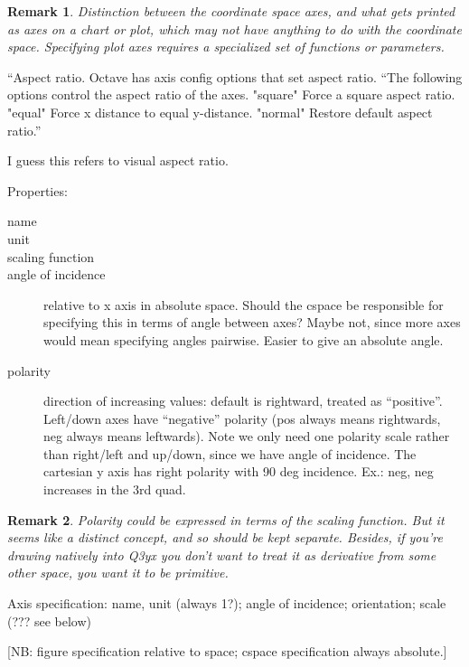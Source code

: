 \documentclass{tufte-handout}
\numberwithin{equation}{subsection}
\newtheorem{remark}{Remark}
\begin{document}
\begin{remark}
  Distinction between the coordinate space axes, and what gets printed
  as axes on a chart or plot, which may not have anything to do with
  the coordinate space.  Specifying plot axes requires a specialized
  set of functions or parameters.
\end{remark}

``Aspect ratio.  Octave has axis config options that set aspect ratio.
``The following options control the aspect ratio of the axes.
"square" Force a square aspect ratio.
"equal" Force x distance to equal y-distance.
"normal" Restore default aspect ratio.''

I guess this refers to visual aspect ratio.

Properties:

\begin{description}
\item [name]
\item [unit]
\item [scaling function]
\item [angle of incidence] relative to x axis in absolute space.
  Should the cspace be responsible for specifying this in terms of
  angle between axes?  Maybe not, since more axes would mean
  specifying angles pairwise.  Easier to give an absolute angle.
\item [polarity] direction of increasing values: default is rightward,
  treated as ``positive''.  Left/down axes have ``negative'' polarity
  (pos always means rightwards, neg always means leftwards).  Note we
  only need one polarity scale rather than right/left and up/down,
  since we have angle of incidence.  The cartesian y axis has right
  polarity with 90 deg incidence.  Ex.: neg, neg increases in the 3rd
  quad.
\end{description}

\begin{remark}
  Polarity could be expressed in terms of the scaling function.  But
  it seems like a distinct concept, and so should be kept separate.
  Besides, if you're drawing natively into Q3yx you don't want to
  treat it as derivative from some other space, you want it to be
  primitive.
\end{remark}

Axis specification:  name, unit (always 1?); angle of incidence; orientation; scale (??? see below)

[NB: figure specification relative to space; cspace specification always absolute.]
\end{document}

